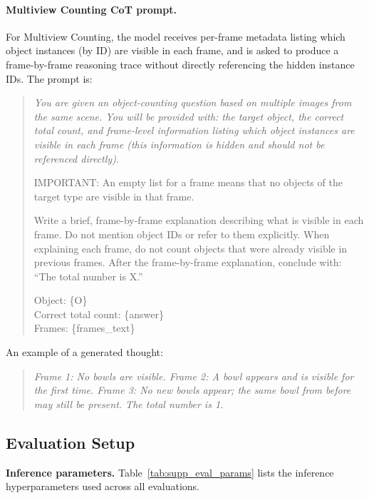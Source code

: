 \paragraph{Multiview Counting CoT prompt.}
For Multiview Counting, the model receives per-frame metadata listing which object instances (by ID) are visible in each frame, and is asked to produce a frame-by-frame reasoning trace without directly referencing the hidden instance IDs. The prompt is:
 
\begin{quote}\small\itshape
You are given an object-counting question based on multiple images from the same scene. You will be provided with: the target object, the correct total count, and frame-level information listing which object instances are visible in each frame (this information is hidden and should not be referenced directly).
 
\smallskip
\noindent IMPORTANT: An empty list for a frame means that no objects of the target type are visible in that frame.
 
\smallskip
\noindent Write a brief, frame-by-frame explanation describing what is visible in each frame. Do not mention object IDs or refer to them explicitly. When explaining each frame, do not count objects that were already visible in previous frames.  After the frame-by-frame explanation, conclude with: ``The total number is X.''
 
\smallskip
\noindent Object: \{O\}\\
Correct total count: \{answer\}\\
Frames: \{frames\_text\}
\end{quote}


 \noindent An example of a generated thought:
\begin{quote}\small\itshape
Frame 1: No bowls are visible.  Frame 2: A bowl appears and is visible for the first time.  Frame 3: No new bowls appear; the same bowl from before may still be present. The total number is 1.
\end{quote}
 



\subsection{Evaluation Setup}
\label{supp_eval}

\noindent\textbf{Inference parameters.}
Table~\ref{tab:supp_eval_params} lists the inference hyperparameters used across all evaluations.

